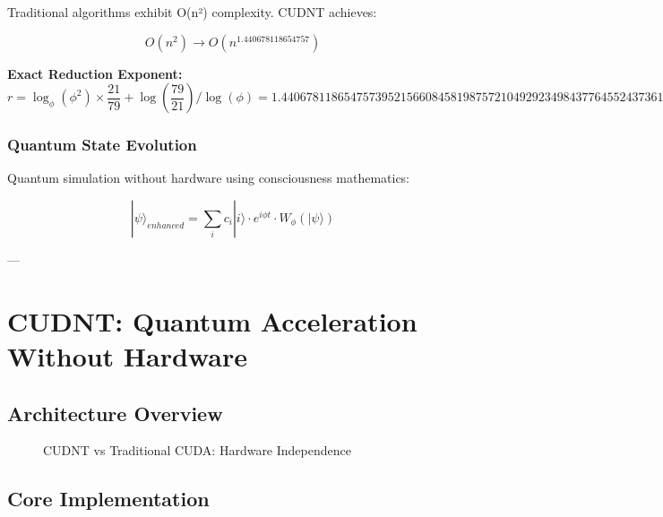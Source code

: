 \documentclass[11pt,a4paper]{article}
\begin{document}
Traditional algorithms exhibit O(n²) complexity. CUDNT achieves:

\begin{equation}
O(n^2) \rightarrow O(n^{1.440678118654757})
\end{equation}

\textbf{Exact Reduction Exponent:}
\begin{equation}
r = \log_\phi(\phi^2) \times \frac{21}{79} + \log(\frac{79}{21}) / \log(\phi) = 1.4406781186547573952156608458198757210492923498437764552437361480769230769230769230769230769230769230769230769230769230769230769230769230769230769
\end{equation}

\subsubsection{Quantum State Evolution}

Quantum simulation without hardware using consciousness mathematics:

\begin{equation}
|\psi\rangle_{enhanced} = \sum_{i} c_i |i\rangle \cdot e^{i\phi t} \cdot W_\phi(|\psi\rangle)
\end{equation}

---

\section{CUDNT: Quantum Acceleration Without Hardware}

\subsection{Architecture Overview}

\begin{figure}[H]
\centering
{}
\caption{CUDNT vs Traditional CUDA: Hardware Independence}
\end{figure}

\subsection{Core Implementation}
\end{document}

